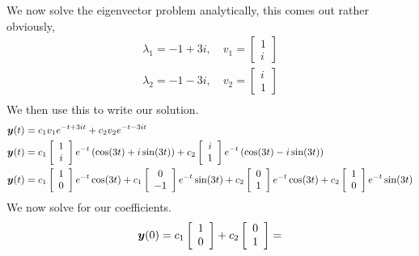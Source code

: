 \documentclass{article}
\begin{document}
\begin{enumerate}[label=\alph*)]
        We now solve the eigenvector problem analytically, this comes out rather obviously, 
        \begin{align}
            \lambda_1 = -1 + 3i, \quad v_1 = \left[\begin{array}{c}1 \\ i \end{array}\right] \\
            \lambda_2 = -1 - 3i, \quad v_2 = \left[\begin{array}{c}i \\ 1 \end{array}\right] \\
        \end{align}
        We then use this to write our solution.
        \begin{align}
            \boldsymbol{y}(t) &= c_1v_1e^{-t + 3it} + c_2v_2e^{-t - 3it} \\
            \boldsymbol{y}(t) &= c_1\left[\begin{array}{c}1 \\ i \end{array}\right]e^{-t}\left(\cos(3t) + i\sin(3t)\right) 
                         + c_2\left[\begin{array}{c}i \\ 1 \end{array}\right]e^{-t}\left(\cos(3t) - i\sin(3t)\right) \\
             \boldsymbol{y}(t) &= c_1\left[\begin{array}{c}1 \\ 0 \end{array}\right]e^{-t}\cos(3t) 
                        +  c_1\left[\begin{array}{c}0 \\ -1 \end{array}\right]e^{-t}\sin(3t)
                         + c_2\left[\begin{array}{c}0 \\ 1 \end{array}\right]e^{-t}\cos(3t)
                          + c_2\left[\begin{array}{c}1 \\ 0 \end{array}\right]e^{-t}\sin(3t)
        \end{align}
        We now solve for our coefficients. 
        \begin{align}
            \bs{y}(0) = c_1\left[\begin{array}{c}1\\0\end{array}\right] + c_2\left[\begin{array}{c}0\\1\end{array}\right] =

\end{align}
\end{enumerate}
\end{document}
